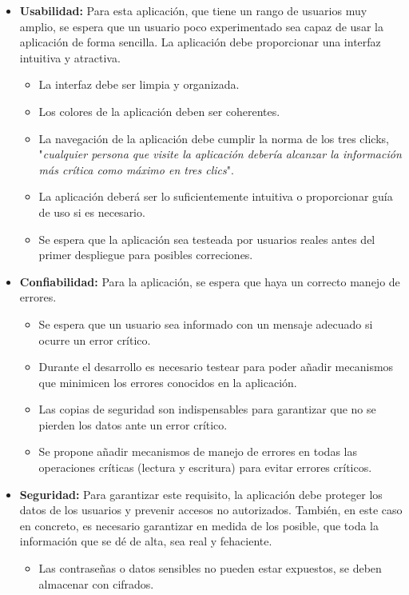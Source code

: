 \documentclass[a4paper, 12pt]{article}
\begin{document}
\begin{itemize}[noitemsep]
\begin{itemize}[noitemsep]
		\end{itemize}
	\item \textbf{Usabilidad:} Para esta aplicación, que tiene un rango de usuarios muy amplio, se espera que un usuario poco experimentado sea capaz de usar la aplicación de forma sencilla. La aplicación debe proporcionar una interfaz intuitiva y atractiva. 
		\begin{itemize}[noitemsep]
			\item La interfaz debe ser limpia y organizada.
			\item Los colores de la aplicación deben ser coherentes.
			\item La navegación de la aplicación debe cumplir la norma de los tres clicks, "\textit{cualquier persona que visite la aplicación debería alcanzar la información más crítica como máximo en tres clics}".
			\item La aplicación deberá ser lo suficientemente intuitiva o proporcionar guía de uso si es necesario.
			\item Se espera que la aplicación sea testeada por usuarios reales antes del primer despliegue para posibles correciones.
		\end{itemize}
	\item \textbf{Confiabilidad:} Para la aplicación, se espera que haya un correcto manejo de errores.
		\begin{itemize}[noitemsep]
			\item Se espera que un usuario sea informado con un mensaje adecuado si ocurre un error crítico.
			\item Durante el desarrollo es necesario testear para poder añadir mecanismos que minimicen los errores conocidos en la aplicación.
			\item Las copias de seguridad son indispensables para garantizar que no se pierden los datos ante un error crítico.
			\item Se propone añadir mecanismos de manejo de errores en todas las operaciones críticas (lectura y escritura)  para evitar errores críticos.
		\end{itemize}
	\item \textbf{Seguridad:} Para garantizar este requisito, la aplicación debe proteger los datos de los usuarios y prevenir accesos no autorizados. También, en este caso en concreto, es necesario garantizar en medida de los posible, que toda la información que se dé de alta, sea real y fehaciente.
		\begin{itemize}[noitemsep]
			\item Las contraseñas o datos sensibles no pueden estar expuestos, se deben almacenar con cifrados.

\end{itemize}
\end{itemize}
\end{document}
